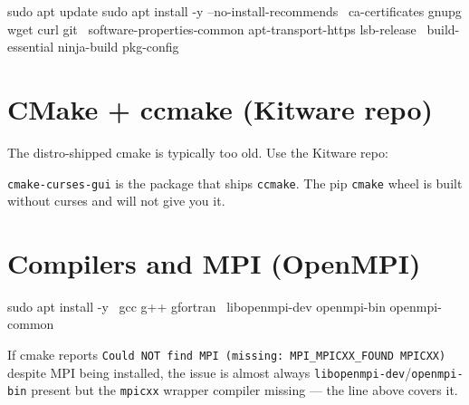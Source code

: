 \documentclass[11pt]{article}
\begin{document}
\begin{codebox}
sudo apt update
sudo apt install -y --no-install-recommends \
    ca-certificates gnupg wget curl git \
    software-properties-common apt-transport-https lsb-release \
    build-essential ninja-build pkg-config
\end{codebox}

\section{CMake + ccmake (Kitware repo)}

The distro-shipped cmake is typically too old.  Use the Kitware repo:


\texttt{cmake-curses-gui} is the package that ships \texttt{ccmake}.  The pip
\texttt{cmake} wheel is built without curses and will not give you it.

\section{Compilers and MPI (OpenMPI)}

\begin{codebox}
sudo apt install -y \
    gcc g++ gfortran \
    libopenmpi-dev openmpi-bin openmpi-common
\end{codebox}

If cmake reports \texttt{Could NOT find MPI (missing: MPI\_MPICXX\_FOUND
MPICXX)} despite MPI being installed, the issue is almost always
\texttt{libopenmpi-dev}/\texttt{openmpi-bin} present but the \texttt{mpicxx}
wrapper compiler missing --- the line above covers it.
\end{document}

